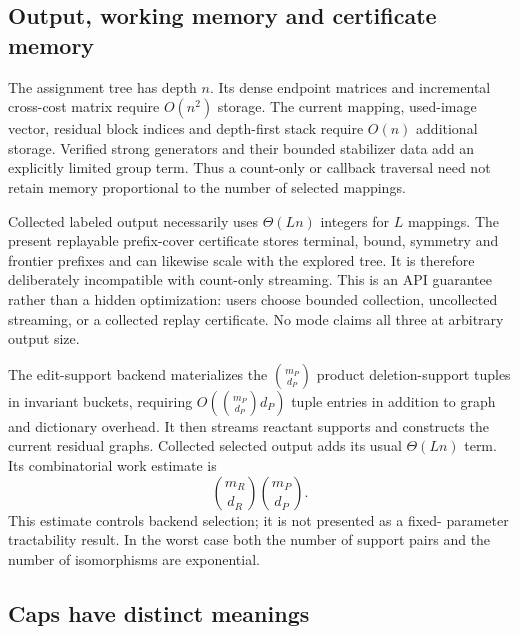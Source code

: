 \documentclass[11pt]{article}
\theoremstyle{definition}
\begin{document}
\subsection{Output, working memory and certificate memory}

The assignment tree has depth \(n\).  Its dense endpoint matrices and
incremental cross-cost matrix require \(O(n^2)\) storage.  The current mapping,
used-image vector, residual block indices and depth-first stack require
\(O(n)\) additional storage.  Verified strong generators and their bounded
stabilizer data add an explicitly limited group term.  Thus a count-only or
callback traversal need not retain memory proportional to the number of
selected mappings.

Collected labeled output necessarily uses \(\Theta(Ln)\) integers for \(L\)
mappings.  The present replayable prefix-cover certificate stores terminal,
bound, symmetry and frontier prefixes and can likewise scale with the explored
tree.  It is therefore deliberately incompatible with count-only streaming.
This is an API guarantee rather than a hidden optimization: users choose
bounded collection, uncollected streaming, or a collected replay certificate.
No mode claims all three at arbitrary output size.

The edit-support backend materializes the
\(\binom{m_P}{d_P}\) product deletion-support tuples in invariant buckets,
requiring \(O(\binom{m_P}{d_P}d_P)\) tuple entries in addition to graph and
dictionary overhead.  It then streams reactant supports and constructs the
current residual graphs.  Collected selected output adds its usual
\(\Theta(Ln)\) term.  Its combinatorial work estimate is
\[
 \binom{m_R}{d_R}\binom{m_P}{d_P}.
\]
This estimate controls backend selection; it is not presented as a fixed-
parameter tractability result.  In the worst case both the number of support
pairs and the number of isomorphisms are exponential.

\subsection{Caps have distinct meanings}
\end{document}
